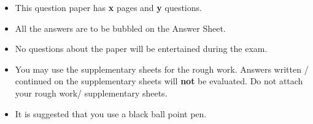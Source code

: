 
\begin{itemize}
   \item This question paper has {\bf x} pages and  {\bf y} questions.

   \item All the answers are to be bubbled  on the Answer Sheet.

   \item  No questions about the paper will be entertained during the exam.

   \item You may use the supplementary sheets for the rough work. Answers
     written / continued on the supplementary sheets will {\bf not} be
     evaluated. Do not attach your rough work/ supplementary sheets.
     
   \item It is suggested that you use a black ball point pen.
\end{itemize}





